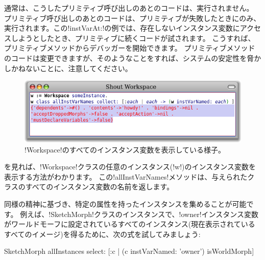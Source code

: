 \documentclass[a4paper,10pt,twoside]{book}
\begin{document}
通常は、こうしたプリミティブ呼び出しのあとのコードは、実行されません。
プリミティブ呼び出しのあとのコードは、プリミティブが失敗したときにのみ、実行されます。この\ct!instVarAt:!の例では、存在しないインスタンス変数にアクセスしようとしたとき、プリミティブに続くコードが試されます。
こうすれば、プリミティブメソッドからデバッガーを開始できます。
プリミティブメソッドのコードは変更できますが、そのようなことをすれば、\pharo{}システムの安定性を脅かしかねないことに、注意してください。%

\begin{figure}[ht]\centering
	\includegraphics[width=\linewidth]{allInstanceVariables}
	\caption{\ct!Workspace!のすべてのインスタンス変数を表示している様子。}
\end{figure}

を見れば、\ct!Workspace!クラスの任意のインスタンス(\ct!w!)のインスタンス変数を表示する方法がわかります。
この\ct!allInstVarNames!メソッドは、与えられたクラスのすべてのインスタンス変数の名前を返します。

同様の精神に基づき、特定の属性を持ったインスタンスを集めることが可能です。%
例えば、\ct!SketchMorph!クラスのインスタンスで、\ct!owner!インスタンス変数がワールドモーフに設定されているすべてのインスタンス(\ie 現在表示されているすべてのイメージ)を得るために、次の式を試してみましょう:
\begin{code}{}
SketchMorph allInstances select: [:c | (c instVarNamed: 'owner') isWorldMorph]
\end{code}
\end{document}

